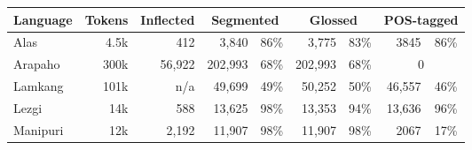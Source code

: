 \begin{table}
    \centering
    \begin{tabular}{l|r|r|rc|rc|rc}
         \textbf{Language} & \textbf{Tokens} & \textbf{Inflected} & \multicolumn{2}{c|}{\textbf{Segmented}} & \multicolumn{2}{c|}{\textbf{Glossed}} & \multicolumn{2}{c}{\textbf{POS-tagged}} \\
         \hline
         Alas & 4.5k  & 412 & 3,840 & 86\% & 3,775 & 83\% & 3845  & 86\% \\
         \hline
         Arapaho & 300k &  56,922 & 202,993 & 68\%  & 202,993 & 68\% & \multicolumn{2}{c}{0}  \\
         \hline
         Lamkang & 101k & n/a & 49,699 & 49\%  & 50,252 & 50\% & 46,557 & 46\% \\
         \hline
         Lezgi & 14k & 588 & 13,625  & 98\%  & 13,353  &  94\% & 13,636 & 96\%  \\
         \hline
         Manipuri & 12k  & 2,192 & 11,907 & 98\%  & 11,907 & 98\% & 2067 & 17\% \\

\end{tabular}
\end{table}
